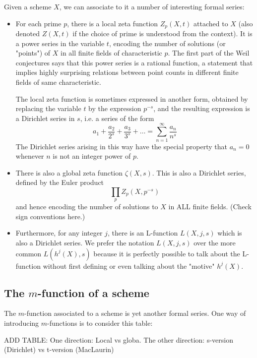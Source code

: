 \documentclass[paper=a4, fontsize=11pt]{scrartcl} %
\numberwithin{equation}{section} %
\numberwithin{figure}{section} %
\numberwithin{table}{section} %
\begin{document}
Given a scheme $X$, we can associate to it a number of interesting formal series:
\begin{itemize}

\item For each prime $p$, there is a local zeta function $Z_p(X, t)$ attached to $X$ (also denoted $Z(X, t)$ if the choice of prime is understood from the context). It is a power series in the variable $t$, encoding the number of solutions (or "points") of $X$ in all finite fields of characteristic $p$. The first part of the Weil conjectures says that this power series is a rational function, a statement that implies highly surprising relations between point counts in different finite fields of same characteristic.

The local zeta function is sometimes expressed in another form, obtained by replacing the variable $t$ by the expression $p^{-s}$, and the resulting expression is a Dirichlet series in $s$, i.e. a series of the form
$$ a_1 + \frac{a_2}{2^s} + \frac{a_3}{3^s} + \ldots = \sum_{n=1}^{\infty} \frac{a_n}{n^s}   $$
The Dirichlet series arising in this way have the special property that $a_n=0$ whenever $n$ is not an integer power of $p$.

\item There is also a global zeta function $\zeta(X, s)$. This is also a Dirichlet series, defined by the Euler product
$$  \prod_p Z_p(X, p^{-s})  $$
and hence encoding the number of solutions to $X$ in ALL finite fields. (Check sign conventions here.)

\item Furthermore, for any integer $j$, there is an L-function $L(X, j, s)$ which is also a Dirichlet series. We prefer the notation $L(X, j, s)$ over the more common $L(h^j(X), s)$ because it is perfectly possible to talk about the L-function without first defining or even talking about the "motive" $h^j(X)$.

\end{itemize}


\subsection{The $m$-function of a scheme}

The $m$-function associated to a scheme is yet another formal series. One way of introducing $m$-functions is to consider this table:

ADD TABLE: One direction: Local vs globa. The other direction: s-version (Dirichlet) vs t-version (MacLaurin)
\end{document}

